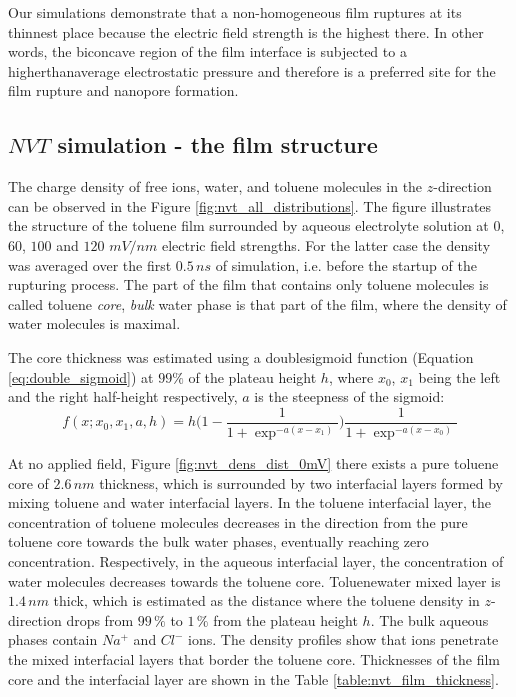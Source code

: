 Our simulations demonstrate that a non-homogeneous film ruptures at its thinnest place because the electric field strength is the highest there. In other words, the biconcave region of the film interface is subjected to a higher\textendash than\textendash average electrostatic pressure and therefore is a preferred site for the film rupture and nano\textendash pore formation.\\


\subsection{$NVT$ simulation - the film structure}
The charge density  of free ions, water, and toluene molecules in the $z$-direction can be observed in the Figure \ref{fig:nvt_all_distributions}. The  figure illustrates the structure of the toluene film surrounded by aqueous electrolyte solution at $0$, $60$, $100$ and $120$ $mV/nm$ electric field strengths. For the latter case the density was averaged over the first $0.5\, ns$ of simulation, i.e. before the startup of the rupturing process. The part of the  film that contains only toluene molecules is called toluene {\it core}, {\it bulk} water phase is that part of the film, where the density of water molecules is maximal.

The core thickness was estimated using a double\textendash sigmoid function (Equation \ref{eq:double_sigmoid}) at $99\%$ of the plateau height $h$, where $x_0$, $x_1$ being the left and the right half-height respectively, $a$ is the steepness of the sigmoid:
\begin{equation}
f(x;x_0, x_1, a, h) = h\bigg(1 - \frac{1}{1 + \exp^{-a(x-x_1)}}\bigg) \frac{1}{1 + \exp^{-a(x-x_0)}}
\label{eq:double_sigmoid}
\end{equation}

At no applied field, Figure \ref{fig:nvt_dens_dist_0mV} there exists a pure toluene core of $2.6\, nm$ thickness, which is surrounded by two interfacial layers formed by mixing toluene and water interfacial layers. In the toluene interfacial layer, the concentration of toluene molecules decreases in the direction from the pure toluene core towards the bulk water phases, eventually reaching zero concentration. Respectively, in the aqueous interfacial layer, the concentration of water molecules decreases towards the toluene core. Toluene\textendash water mixed layer is $1.4\, nm$ thick, which is estimated as the distance where the toluene density in $z$-direction drops from $99\, \%$ to $1\, \%$ from the plateau height $h$. The bulk aqueous phases contain $Na^+$ and $Cl^-$ ions. The density profiles show that ions penetrate the mixed interfacial layers that border the toluene core. 
Thicknesses of the film core and the interfacial layer are shown in the Table \ref{table:nvt_film_thickness}.

